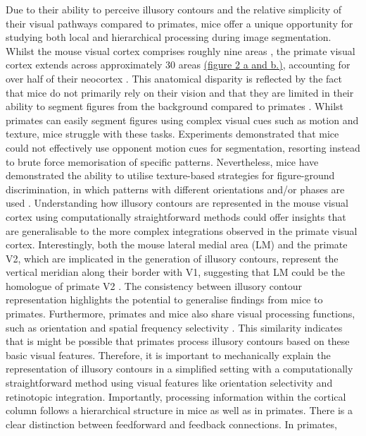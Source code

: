 \documentclass[12pt]{article}
\begin{document}

\bigbreak
Due to their ability to perceive illusory contours and the relative simplicity of their visual pathways compared to primates, mice offer a unique opportunity for studying both local and hierarchical processing during image segmentation. Whilst the mouse visual cortex comprises roughly nine areas \autocite{wangAreaMapMouse2007}, the primate visual cortex extends across approximately 30 areas \hyperref[fig:Laminar_Figure]{(figure 2 a and b.)}, accounting for over half of their neocortex \autocite{fellemanDistributedHierarchicalProcessing1991}. This anatomical disparity is reflected by the fact that mice do not primarily rely on their vision and that they are limited in their ability to segment figures from the background compared to primates \autocite{luongoMicePrimatesUse2023}. Whilst primates can easily segment figures using complex visual cues such as motion and texture, mice struggle with these tasks. Experiments demonstrated that mice could not effectively use opponent motion cues for segmentation, resorting instead to brute force memorisation of specific patterns. Nevertheless, mice have demonstrated the ability to utilise texture-based strategies for figure-ground discrimination, in which patterns with different orientations and/or phases are used \autocite{kirchbergerEssentialRoleFeedback2020}. Understanding how illusory contours are represented in the mouse visual cortex using computationally straightforward methods could offer insights that are generalisable to the more complex integrations observed in the primate visual cortex. Interestingly, both the mouse lateral medial area (LM) and the primate V2, which are implicated in the generation of illusory contours, represent the vertical meridian along their border with V1, suggesting that LM could be the homologue of primate V2 \autocite{gamanutAnatomicalFunctionalConnectomes2022}. The consistency between illusory contour representation highlights the potential to generalise findings from mice to primates. Furthermore, primates and mice also share visual processing functions, such as orientation and spatial frequency selectivity \autocite{niellHighlySelectiveReceptive2008}. This similarity indicates that is might be possible that primates process illusory contours based on these basic visual features. Therefore, it is important to mechanically explain the representation of illusory contours in a simplified setting with a computationally straightforward method using visual features like orientation selectivity and retinotopic integration. Importantly, processing information within the cortical column follows a hierarchical structure in mice as well as in primates. There is a clear distinction between feedforward and feedback connections. In primates, 
\end{document}
